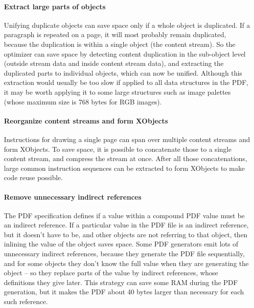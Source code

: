 \documentclass{ltugproc}
\begin{document}
\paragraph{Extract large parts of objects}

Unifying duplicate objects can save space only if a whole object is
duplicated. If a paragraph is repeated on a page, it will most probably
remain duplicated, because the duplication is within a single object (the
content stream). So the optimizer can save space by detecting content
duplication in the sub-object level (outside stream data and inside content
stream data), and extracting the duplicated parts to individual objects,
which can now be unified. Although this extraction would usually be too
slow if applied to all data structures in the PDF, it may be worth applying
it to some large structures such as image palettes (whose maximum size is
768 bytes for RGB images).

\paragraph{Reorganize content streams and form XObjects}

Instructions for drawing a single page can span over multiple content
streams and form XObjects. To save space, it is possible to concatenate
those to a single content stream, and compress the stream at once. After all
those concatenations, large common instruction sequences can be extracted
to form XObjects to make code reuse possible.

\paragraph{Remove unnecessary indirect references}

The PDF specification defines if a value within a compound PDF value must
be an indirect reference. If a particular value in the PDF file is an
indirect reference, but it doesn't have to be, and other objects are not
referring to that object, then inlining the value of the object saves space.
Some PDF generators emit lots of unnecessary indirect references, because
they generate the PDF file sequentially, and for some objects they don't
know the full value when they are generating the object -- so they replace
parts of the value by indirect references, whose definitions they give
later. This strategy can save some RAM during the PDF generation, but it
makes the PDF about 40 bytes larger than necessary for each such reference.
\end{document}
